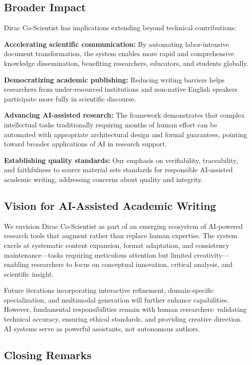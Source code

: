 \documentclass{ieeeaccess}
\begin{document}
\subsection{Broader Impact}

Dirac Co-Scientist has implications extending beyond technical contributions:

\textbf{Accelerating scientific communication:} By automating labor-intensive document transformation, the system enables more rapid and comprehensive knowledge dissemination, benefiting researchers, educators, and students globally.

\textbf{Democratizing academic publishing:} Reducing writing barriers helps researchers from under-resourced institutions and non-native English speakers participate more fully in scientific discourse.

\textbf{Advancing AI-assisted research:} The framework demonstrates that complex intellectual tasks traditionally requiring months of human effort can be automated with appropriate architectural design and formal guarantees, pointing toward broader applications of AI in research support.

\textbf{Establishing quality standards:} Our emphasis on verifiability, traceability, and faithfulness to source material sets standards for responsible AI-assisted academic writing, addressing concerns about quality and integrity.

\subsection{Vision for AI-Assisted Academic Writing}

We envision Dirac Co-Scientist as part of an emerging ecosystem of AI-powered research tools that augment rather than replace human expertise. The system excels at systematic content expansion, format adaptation, and consistency maintenance—tasks requiring meticulous attention but limited creativity—enabling researchers to focus on conceptual innovation, critical analysis, and scientific insight.

Future iterations incorporating interactive refinement, domain-specific specialization, and multimodal generation will further enhance capabilities. However, fundamental responsibilities remain with human researchers: validating technical accuracy, ensuring ethical standards, and providing creative direction. AI systems serve as powerful assistants, not autonomous authors.

\subsection{Closing Remarks}
\end{document}
